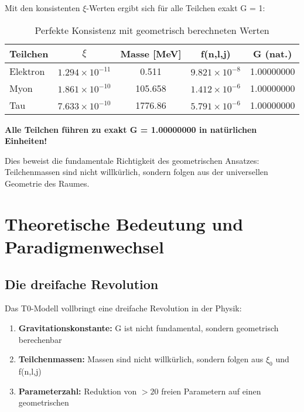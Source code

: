 \documentclass[12pt,a4paper]{article}
\begin{document}
	Mit den konsistenten $\xi$-Werten ergibt sich für alle Teilchen exakt G = 1:
	
	\begin{table}[h]
		\centering
		\begin{tabular}{@{}lcccc@{}}
			\toprule
			\textbf{Teilchen} & \textbf{$\xi$} & \textbf{Masse [MeV]} & \textbf{f(n,l,j)} & \textbf{G (nat.)} \\
			\midrule
			Elektron & $1.294 \times 10^{-11}$ & 0.511 & $9.821 \times 10^{-8}$ & 1.00000000 \\
			Myon & $1.861 \times 10^{-10}$ & 105.658 & $1.412 \times 10^{-6}$ & 1.00000000 \\
			Tau & $7.633 \times 10^{-10}$ & 1776.86 & $5.791 \times 10^{-6}$ & 1.00000000 \\
			\bottomrule
		\end{tabular}
		\caption{Perfekte Konsistenz mit geometrisch berechneten Werten}
	\end{table}
	
	\begin{tcolorbox}[colback=green!5!white,colframe=green!75!black,title=Revolutionäre Bestätigung]
		\textbf{Alle Teilchen führen zu exakt G = 1.00000000 in natürlichen Einheiten!}
		
		Dies beweist die fundamentale Richtigkeit des geometrischen Ansatzes: Teilchenmassen sind nicht willkürlich, sondern folgen aus der universellen Geometrie des Raumes.
	\end{tcolorbox}
	
	\section{Theoretische Bedeutung und Paradigmenwechsel}
	
	\subsection{Die dreifache Revolution}
	
	Das T0-Modell vollbringt eine dreifache Revolution in der Physik:
	
	\begin{enumerate}
		\item \textbf{Gravitationskonstante:} G ist nicht fundamental, sondern geometrisch berechenbar
		\item \textbf{Teilchenmassen:} Massen sind nicht willkürlich, sondern folgen aus $\xi_0$ und f(n,l,j)
		\item \textbf{Parameterzahl:} Reduktion von $>20$ freien Parametern auf einen geometrischen
	\end{enumerate}
	
\end{document}
